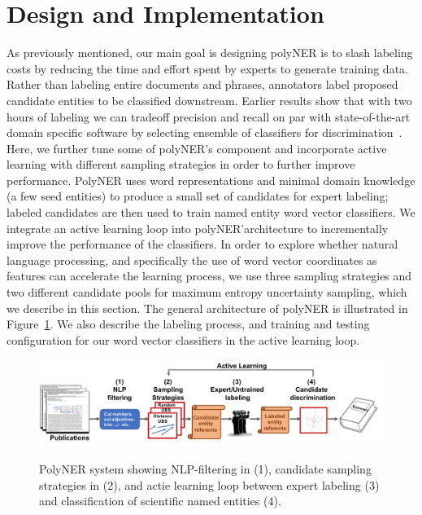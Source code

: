 \section{Design and Implementation}
\label{sect:apner_architecture}
As previously mentioned, our main goal is designing polyNER is to slash labeling costs by reducing the time and effort spent by experts to generate training data. 
Rather than labeling entire documents and phrases, annotators label proposed candidate entities to be classified downstream.
Earlier results show that with two hours of labeling we can 
tradeoff precision and recall on par with state-of-the-art domain specific software by selecting ensemble of classifiers for discrimination~\cite{tchoua2019polyner}.
Here, we further tune some of polyNER's component and incorporate active learning with different sampling strategies in order to further improve performance.
PolyNER uses word representations and minimal domain knowledge (a few
seed entities) to produce a small set of candidates for expert labeling;
labeled candidates are then used to train named entity word vector classifiers.
We integrate an active learning loop into polyNER'architecture to incrementally improve the performance of the classifiers.
In order to explore whether natural language processing, and specifically the use of word vector coordinates as features can accelerate the learning process,
we use three sampling strategies and two different candidate pools for maximum entropy uncertainty sampling, which we describe in this section.
The general architecture of polyNER is illustrated in Figure~\ref{fig:architecture}.
We also describe the labeling process, and training and testing configuration for our word vector classifiers in the active learning loop. 

\begin{figure}[!t]
{\includegraphics[width=\textwidth]{figures/architecture.pdf}}
\caption{\label{fig:architecture} PolyNER system showing NLP-filtering in (1), candidate sampling strategies in (2), and actie learning loop between expert labeling (3) and classification of scientific named entities (4). 
}
\end{figure}

